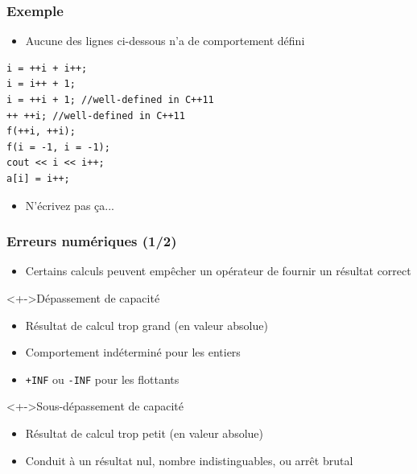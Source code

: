 \begin{frame}[containsverbatim]
\frametitle{Exemple}
\begin{itemize}
\item Aucune des lignes ci-dessous n'a de comportement défini
\end{itemize}
\begin{lstlisting}
i = ++i + i++; 
i = i++ + 1; 
i = ++i + 1; //well-defined in C++11
++ ++i; //well-defined in C++11
f(++i, ++i); 
f(i = -1, i = -1); 
cout << i << i++; 
a[i] = i++;
\end{lstlisting}
\begin{itemize}
\item N'écrivez pas ça...
\end{itemize}
\end{frame}

\begin{frame}
\frametitle{Erreurs numériques (1/2)}
\begin{itemize}[<+->]
\item Certains calculs peuvent empêcher un opérateur de fournir un résultat correct
\end{itemize}
\begin{exampleblock}<+->{Dépassement de capacité}
	\begin{itemize}[<+->]
	\item Résultat de calcul trop grand (en valeur absolue)
	\item Comportement indéterminé pour les entiers
	\item \texttt{+INF} ou \texttt{-INF} pour les flottants
	\end{itemize}
\end{exampleblock}
\begin{exampleblock}<+->{Sous-dépassement de capacité}
	\begin{itemize}[<+->]
	\item Résultat de calcul trop petit (en valeur absolue)
	\item Conduit à un résultat nul, nombre indistinguables, ou arrêt brutal
	\end{itemize}
\end{exampleblock}
\end{frame}

